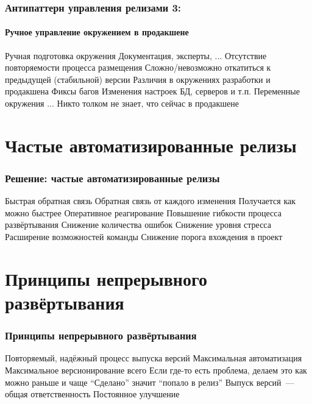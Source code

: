 \documentclass{../../slides-style}
\begin{document}
    \begin{frame}
        \frametitle{Антипаттерн управления релизами 3:}
        \framesubtitle{Ручное управление окружением в продакшене}
        \begin{outline}
            \1 Ручная подготовка окружения
                \2 Документация, эксперты, ...
            \1 Отсутствие повторяемости процесса размещения
                \2 Сложно/невозможно откатиться к предыдущей (стабильной) версии
            \1 Различия в окружениях разработки и продакшена
                \2 Фиксы багов
                \2 Изменения настроек БД, серверов и т.п.
                \2 Переменные окружения
                \2 ...
            \1 Никто толком не знает, что сейчас в продакшене
        \end{outline}
    \end{frame}

    \section{Частые автоматизированные релизы}

    \begin{frame}
        \frametitle{Решение: частые автоматизированные релизы}
        \begin{outline}
            \1 Быстрая обратная связь
                \2 Обратная связь от каждого изменения
                \2 Получается как можно быстрее
                \2 Оперативное реагирование
            \1 Повышение гибкости процесса развёртывания
            \1 Снижение количества ошибок
            \1 Снижение уровня стресса
            \1 Расширение возможностей команды
            \1 Снижение порога вхождения в проект
        \end{outline}
    \end{frame}

    \section{Принципы непрерывного развёртывания}

    \begin{frame}
        \frametitle{Принципы непрерывного развёртывания}
        \begin{outline}
            \1 Повторяемый, надёжный процесс выпуска версий
            \1 Максимальная автоматизация
            \1 Максимальное версионирование всего
            \1 Если где-то есть проблема, делаем это как можно раньше и чаще
            \1 ``Сделано'' значит ``попало в релиз''
            \1 Выпуск версий~--- общая ответственность
            \1 Постоянное улучшение
        \end{outline}
    \end{frame}
\end{document}
